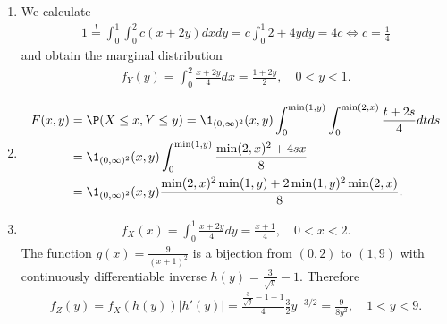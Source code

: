 \begin{solution}

\phantom{}

\begin{enumerate}[label = (\alph*)]
  \item We calculate
  \begin{align*}
    1 \stackrel{!}{=} \int_0^1\int_0^2 c(x + 2y) dx dy = c\int_0^1 2 + 4y dy = 4c
    \iff c = \frac{1}{4}
  \end{align*}
  and obtain the marginal distribution
  \begin{align*}
    f_Y(y) = \int_0^2 \frac{x + 2y}{4} dx = \frac{1 + 2y}{2}, \quad 0 < y < 1.
  \end{align*}
  \item
  \begin{align*}
    F(x,y) &= \P(X \leq x, Y \leq y) = \1_{(0,\infty)^2}(x,y)\int_0^{\min(1,y)}
    \int_0^{\min(2,x)} \frac{t+2s}{4} dt ds \\
    &= \1_{(0,\infty)^2}(x,y)\int_0^{\min(1,y)} \frac{\min(2,x)^2 + 4sx}{8} \\
    &= \1_{(0,\infty)^2}(x,y)\frac{\min(2,x)^2\min(1,y) + 2\min(1,y)^2\min(2,x)}{8}.
  \end{align*}
  \item
  \begin{align*}
    f_X(x) = \int_0^1 \frac{x + 2y}{4} dy = \frac{x + 1}{4}, \quad 0 < x < 2.
  \end{align*}
  The function $g(x) = \frac{9}{(x+1)^2}$ is a bijection from $(0,2)$ to $(1,9)$
  with continuously differentiable inverse $h(y) = \frac{3}{\sqrt{y}} - 1$.
  Therefore
  \begin{align*}
    f_Z(y) = f_X(h(y))|h'(y)| = \frac{\frac{3}{\sqrt{y}} - 1 + 1}{4}\frac{3}{2}y^{-3/2}
    = \frac{9}{8y^2}, \quad 1 < y < 9.
  \end{align*}
\end{enumerate}

\end{solution}

